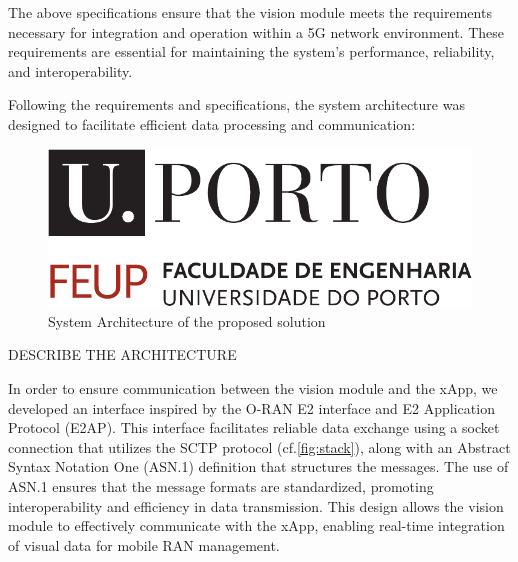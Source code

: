 \begin{table}[H]
\caption{Specifications}
\label{tab:spec}
\centering
{}
\end{table}


The above specifications ensure that the vision module meets the requirements necessary for integration and operation within a 5G network environment. These requirements are essential for maintaining the system's performance, reliability, and interoperability.

Following the requirements and specifications, the system architecture was designed to facilitate efficient data processing and communication:

\begin{figure}[H]
    \centering
    \includegraphics[width=0.5\linewidth]{figures/uporto-feup}
    \caption[System Architecture of the proposed solution]{System Architecture of the proposed solution}
    \label{fig:my_arch}
\end{figure}

DESCRIBE THE ARCHITECTURE


In order to ensure communication between the vision module and the xApp, we developed an interface inspired by the O-RAN E2 interface and E2 Application Protocol (E2AP). This interface facilitates reliable data exchange using a socket connection that utilizes the SCTP protocol (cf.\ref{fig:stack}), along with an Abstract Syntax Notation One (ASN.1) definition that structures the messages. The use of ASN.1 ensures that the message formats are standardized, promoting interoperability and efficiency in data transmission. This design allows the vision module to effectively communicate with the xApp, enabling real-time integration of visual data for mobile RAN management. 

